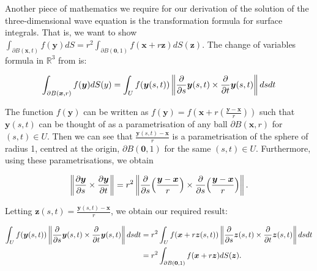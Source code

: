 \documentclass[a4paper, 12pt]{article}
\numberwithin{equation}{section}
\begin{document}
Another piece of mathematics we require for our derivation of the solution of the three-dimensional wave equation is the transformation formula for surface integrals. That is,
we want to show $\int_{\partial B(\boldsymbol{x},t)}f(\boldsymbol{y})dS=r^2\int_{\partial B(\boldsymbol{0},1)} f(\boldsymbol{x}+r\boldsymbol{z})dS(\boldsymbol{z})$. The change of variables formula in $\mathbb{R}^3$ from \cite{LooSter} is:

\begin{equation*}
    \int_{\partial B(\boldsymbol{x},r)}f(\boldsymbol{y})dS(y)=\int_U f(\boldsymbol{y}(s,t))\left\| \diffp[1]{}{s}\boldsymbol{y}(s, t) \times \diffp[1]{}{t}\boldsymbol{y}(s, t) \right \|ds dt
\end{equation*}

The function $f(\boldsymbol{y})$ can be written as $f(\boldsymbol{y})=f(\boldsymbol{x}+r(\frac{\boldsymbol{y}-\boldsymbol{x}}{r}))$ such that $\boldsymbol{y}(s,t)$ can be thought of as a parametrisation of any ball $\partial B(\boldsymbol{x},r)$ for $(s,t)\in U$. Then we can see
that $\frac{\boldsymbol{y}(s,t)-\boldsymbol{x}}{r}$ is a parametrisation of the sphere of radius 1, centred at the origin, $\partial B(\boldsymbol{0},1)$ for the same $(s,t)\in U$. Furthermore, using these parametrisations, we obtain

\begin{equation*}
    \left \| \diffp[1]{\boldsymbol{y}}{s} \times \diffp[1]{\boldsymbol{y}}{t} \right \| =r^2 \left \| \diffp[1]{}{s}\Big(\frac{\boldsymbol{y}-\boldsymbol{x}}{r}\Big) \times \diffp[1]{}{s}\Big( \frac{\boldsymbol{y}-\boldsymbol{x}}{r}\Big) \right \|.
\end{equation*}

Letting $\boldsymbol{z}(s,t)=\frac{\boldsymbol{y}(s,t)-\boldsymbol{x}}{r}$, we obtain our required result:

\begin{equation*}
    \begin{aligned}
    \int_U f(\boldsymbol{y}(s,t)) \left \| \diffp[1]{}{s}\boldsymbol{y}(s, t) \times \diffp{}{t}\boldsymbol{y}(s, t) \right \| dsdt&=r^2\int_U f(\boldsymbol{x}+r\boldsymbol{z}(s,t)) \left \| \diffp[1]{}{s}\boldsymbol{z}(s, t) \times \diffp[1]{}{t}\boldsymbol{z}(s, t) \right \| dsdt\\
    &=r^2\int_{\partial B(\boldsymbol{0},1)}f(\boldsymbol{x}+r\boldsymbol{z})dS(\boldsymbol{z}).
    \end{aligned}
\end{equation*}
\end{document}
